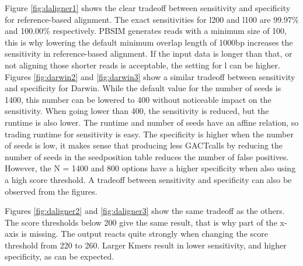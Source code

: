 \documentclass[../thesis.tex]{subfiles}
\begin{document}








Figure \ref{fig:daligner1} shows the clear tradeoff between sensitivity and specificity for reference-based alignment.
The exact sensitivities for l200 and l100 are 99.97\% and 100.00\% respectively.
PBSIM generates reads with a minimum size of 100, this is why lowering the default minimum overlap length of 1000bp increases the sensitivity in reference-based alignment.
If the input data is longer than that, or not aligning those shorter reads is acceptable, the setting for l can be higher.
Figures \ref{fig:darwin2} and \ref{fig:darwin3} show a similar tradeoff between sensitivity and specificity for Darwin.
While the default value for the number of seeds is 1400, this number can be lowered to 400 without noticeable impact on the sensitivity.
When going lower than 400, the sensitivity is reduced, but the runtime is also lower.
The runtime and number of seeds have an affine relation, so trading runtime for sensitivity is easy.
The specificity is higher when the number of seeds is low, it makes sense that producing less GACTcalls by reducing the number of seeds in the seedposition table reduces the number of false positives.
However, the N = 1400 and 800 options have a higher specificity when also using a high score threshold.
A tradeoff between sensitivity and specificity can also be observed from the figures.

Figures \ref{fig:daligner2} and \ref{fig:daligner3} show the same tradeoff as the others.
The score thresholds below 200 give the same result, that is why part of the x-axis is missing.
The output reacts quite strongly when changing the score threshold from 220 to 260.
Larger Kmers result in lower sensitivity, and higher specificity, as can be expected.
\end{document}
